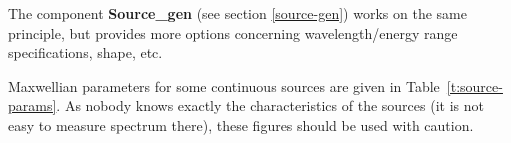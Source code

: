The component \textbf{Source\_gen} (see section \ref{source-gen})
works on the same principle, but provides more options concerning
wavelength/energy range specifications, shape, etc.

Maxwellian parameters for some continuous sources
are given in Table~\ref{t:source-params}. As nobody knows exactly the characteristics of the sources (it is not easy to measure spectrum there), these figures should be used with caution.

